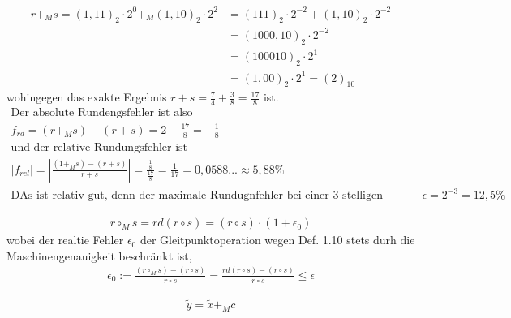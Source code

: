 \documentclass[13pt]{scrreprt}
\begin{document}
\begin{ebox}{21}
	\begin{align*}
	r + _{M} s = (1,11)_2 \cdot 2^0 +_{M} (1,10)_2 \cdot 2^2 &= (111)_2 \cdot 2^{-2} + (1,10)_2 \cdot 2^{-2}\\
	&= (1000,10)_2 \cdot 2^{-2}\\
	&= (100010)_2 \cdot 2^1\\
	&= (1,00)_2 \cdot 2^1 = (2)_{10}
	\end{align*}
	wohingegen das exakte Ergebnis $ r+s = \frac74 + \frac38= \frac{17}{8}$ ist.\\
	\begin{align*}
	\text{Der absolute Rundengsfehler ist also}\\
	f_{rd} = (r+_M s) - (r + s) = 2 -\frac{17}{8} = -\frac{1}{8}\\
	\text{und der relative Rundungsfehler ist}\\
	|f_{rel}| = |\frac{(1 +_M s)-(r+s)}{r+s}| = \frac{\frac18}{\frac{17}{8}} = \frac{1}{17} = 0,0588... \approx 5,88\%\\
	\text{DAs ist relativ gut, denn der maximale Rundugnfehler bei einer 3-stelligen Mantisse ist} \quad \epsilon =   2^{-3} = 12,5\%
	\end{align*}
\end{ebox}


\begin{ebox}{23}
	\begin{align*}
	r \circ_M s = rd(r \circ s) = (r\circ s)\cdot(1 + \epsilon_0)
	\end{align*}
	wobei der realtie Fehler $\epsilon_0$ der Gleitpunktoperation wegen Def. 1.10 stets durh die Maschinengenauigkeit beschränkt ist,
	\begin{align*}
	\epsilon_0 := \frac{(r\circ_M s)-(r \circ s)}{r \circ s} = \frac{rd(r \circ s) - (r \circ s)}{r \circ s} \leqslant \epsilon
	\end{align*}
\end{ebox}

\begin{ebox}{24}
	\begin{align*}
		\tilde{y} = \tilde{x} +_M c \\
		
	\end{align*}
\end{ebox}
\end{document}
